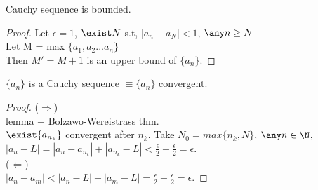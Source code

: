 \begin{lemma}
    Cauchy sequence is bounded.
\end{lemma}
\begin{proof}
    Let $\epsilon = 1$, $\exist N$ s.t, $|a_n-a_N| <1$, $\any n \geq N$\\
    Let M = max $\{a_1, a_2...a_n\}$\\
    Then $M' = M+1$ is an upper bound of $\{a_n\}$.
\end{proof}
\begin{theorem}
    $\{a_n\}$ is a Cauchy sequence $\equiv \{a_n\}$ convergent.
\end{theorem}
\begin{proof}
    ($\Rightarrow$) \\
    lemma + Bolzawo-Wereistrass thm. \\
    $\exist \{a_{n_k}\}$ convergent after $n_k$.
    Take $N_0 = max \{ n_k, N\}$, $\any n \in\N$, $|a_n - L| = |a_n - a_{n_k}| + |a_{n_k} - L| < \frac{\epsilon}{2} + \frac{\epsilon}{2} = \epsilon$. \\
    ($\Leftarrow$) \\
    $|a_n -a_m| < |a_n - L | + |a_m - L | = \frac{\epsilon}{2}+\frac{\epsilon}{2} = \epsilon$.
\end{proof}
